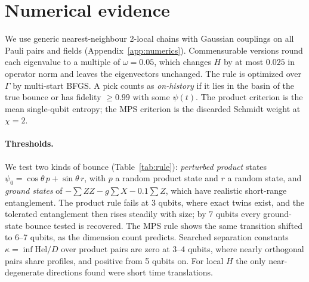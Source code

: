 \documentclass[11pt]{article}
\theoremstyle{definition}
\theoremstyle{remark}
\newcommand{\Hel}{\mathrm{Hel}}
\begin{document}
\section{Numerical evidence}
\label{sec:numerics}

We use generic nearest-neighbour 2-local chains with Gaussian couplings on all Pauli pairs and fields (Appendix~\ref{app:numerics}). Commensurable versions round each eigenvalue to a multiple of $\omega=0.05$, which changes $H$ by at most $0.025$ in operator norm and leaves the eigenvectors unchanged. The rule is optimized over $\Gamma$ by multi-start BFGS. A pick counts as \emph{on-history} if it lies in the basin of the true bounce or has fidelity $\ge0.99$ with some $\psi(t)$. The product criterion is the mean single-qubit entropy; the MPS criterion is the discarded Schmidt weight at $\chi=2$.

\paragraph{Thresholds.} We test two kinds of bounce (Table~\ref{tab:rule}): \emph{perturbed product} states $\psi_0=\cos\theta\,p+\sin\theta\,r$, with $p$ a random product state and $r$ a random state, and \emph{ground states} of $-\sum ZZ-g\sum X-0.1\sum Z$, which have realistic short-range entanglement. The product rule fails at 3 qubits, where exact twins exist, and the tolerated entanglement then rises steadily with size; by 7 qubits every ground-state bounce tested is recovered. The MPS rule shows the same transition shifted to 6--7 qubits, as the dimension count predicts. Searched separation constants $\kappa=\inf\Hel/D$ over product pairs are zero at 3--4 qubits, where nearly orthogonal pairs share profiles, and positive from 5 qubits on. For local $H$ the only near-degenerate directions found were short time translations.
\end{document}
